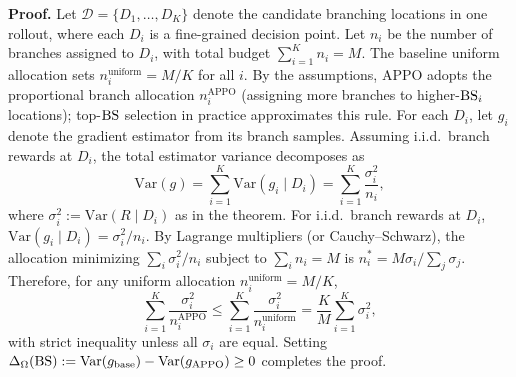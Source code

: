 \documentclass{article}
\begin{document}
\textbf{Proof.}
Let $\mathcal{D}=\{D_1,\dots,D_K\}$ denote the candidate branching locations in one rollout, where each $D_i$ is a fine-grained decision point.
Let $n_i$ be the number of branches assigned to $D_i$, with total budget $\sum_{i=1}^K n_i = M$.
The baseline uniform allocation sets $n_i^{\mathrm{uniform}} = M/K$ for all $i$.
By the assumptions, APPO adopts the proportional branch allocation $n_i^{\mathrm{APPO}}$ (assigning more branches to higher-${\rm BS}_i$ locations); top-${\rm BS}$ selection in practice approximates this rule.
For each $D_i$, let $g_i$ denote the gradient estimator from its branch samples.
Assuming i.i.d.\ branch rewards at $D_i$, the total estimator variance decomposes as
\begin{equation}
\mathrm{Var}(g) = \sum_{i=1}^K \mathrm{Var}(g_i \mid D_i)
= \sum_{i=1}^K \frac{\sigma_i^2}{n_i},
\end{equation}
where $\sigma_i^2 := \mathrm{Var}(R \mid D_i)$ as in the theorem.  For i.i.d.\ branch rewards at $D_i$,
$\mathrm{Var}(g_i \mid D_i) = \sigma_i^2/n_i$.
By Lagrange multipliers (or Cauchy--Schwarz), the allocation minimizing
$\sum_i \sigma_i^2/n_i$ subject to $\sum_i n_i = M$ is
$n_i^* = M \sigma_i / \sum_j \sigma_j$.
Therefore, for any uniform allocation $n_i^{\mathrm{uniform}} = M/K$,
\[
\sum_{i=1}^K \frac{\sigma_i^2}{n_i^{\mathrm{APPO}}}
\le
\sum_{i=1}^K \frac{\sigma_i^2}{n_i^{\mathrm{uniform}}}
= \frac{K}{M}\sum_{i=1}^K \sigma_i^2,
\]
with strict inequality unless all $\sigma_i$ are equal.
Setting $\Delta_\Omega({\rm BS})
:= \mathrm{Var}(g_{\mathrm{base}}) - \mathrm{Var}(g_{\mathrm{APPO}}) \ge 0$
completes the proof.
\end{document}
